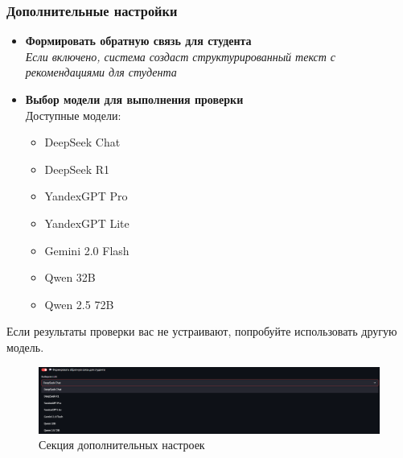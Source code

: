 \documentclass[a4paper,12pt]{article}
\begin{document}
\FloatBarrier
\begin{samepage}
\subsubsection{Дополнительные настройки}
\begin{itemize}
    \item \textbf{Формировать обратную связь для студента}\\
    \textit{Если включено, система создаст структурированный текст с рекомендациями для студента}
    
    \item \textbf{Выбор модели для выполнения проверки}\\
    Доступные модели:
    \begin{itemize}
        \item DeepSeek Chat
        \item DeepSeek R1
        \item YandexGPT Pro 
        \item YandexGPT Lite
        \item Gemini 2.0 Flash
        \item Qwen 32B
        \item Qwen 2.5 72B
    \end{itemize}
\end{itemize}
\end{samepage}

\begin{tcolorbox}[colback=blue!5!white,colframe=blue!75!black,title=Совет]
Если результаты проверки вас не устраивают, попробуйте использовать другую модель.
\end{tcolorbox}

\begin{figure}[!htb]
    \centering
    \includegraphics[width=\linewidth]{assets/additional_settings.png}
    \caption{Секция дополнительных настроек}
\end{figure}
\end{document}
